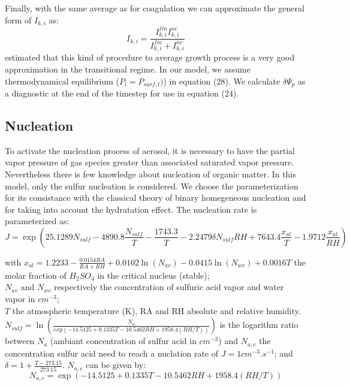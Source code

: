 Finally, with the same average as for coagulation we can approximate the general
form of $I_{k,i}$ as:
\begin{equation}
I_{k,i} = \frac{I^{fm}_{k,i} I^{nc}_{k,i}}{I^{fm}_{k,i} + I^{nc}_{k,i}}
\label{ik_fin}
\end{equation}
\citet{Pratsini-1988} estimated that this kind of procedure to average 
growth process is a very good approximation in the transitional regime.
In our model, we assume thermodynamical equilibrium ($P_l = P_{surf,l}) $) in equation (28).
We calculate $\delta \Psi_p$ as a diagnostic at the end of the timestep for use in equation (24).

\subsection{Nucleation}

To activate the nucleation process of aerosol, it is necessary to 
have
the partial vapor pressure of gas species greater than associated saturated 
vapor pressure.
Nevertheless  there is few knowledge about nucleation of organic matter. In this 
model, only the sulfur nucleation is considered. We choose the \citet{Kulmala-1998} 
parameterization for its consistance with the classical theory of binary 
homegeneous
nucleation \citep{Wilemski-1984} and for taking into account the hydratation 
effect.
The nucleation rate is parameterized as: 
\begin{equation}
J = \exp \left( 25.1289 N_{sulf} - 4890.8 \frac{N_{sulf}}{T} -\frac{1743.3}{T} 
-2.2479 \delta N_{sulf} RH + 7643.4 \frac{x_{al}}{T} - 1.9712 \frac{x_{al}}{RH} 
\right)
\label{nucleation}
\end{equation}

with  
$x_{al}=1.2233 - \frac{0.0154 RA}{RA+RH} + 0.0102 \ln(N_{av})-0.0415\ln(N_{wv}) 
+ 0.0016 T$ the molar fraction of $H_2SO_4$ in the critical nucleus (stable);\\
$N_{av}$ and $N_{wv}$ respectively the concentration  of sulfuric acid vapor and water vapor in 
$cm^{-3}$; \\
$T$ the atmospheric temperature (K), RA and RH absolute and relative humidity. 
$N_{sulf} = \ln\left(\frac{N_a}{exp(-14.5125+0.1335T-10.5462 RH+1958.4(RH/T))} 
\right)$ 
is the logarithm ratio between $N_a$ (ambiant concentration of sulfur acid in 
$cm^{-3}$) and $N_{a,c}$ the concentration sulfur acid need to reach a nuclation 
rate of $J= 1 cm^{-3}.s^{-1}$; 
and $\delta = 1 + \frac{T - 273.15}{273.15}$.
$N_{a,c}$ can be given by:
\begin{equation}
N_{a,c} = \exp (-14.5125 + 0.1335 T - 10.5462 RH + 1958.4 (RH/T)) 
\label{nac}
\end{equation}

